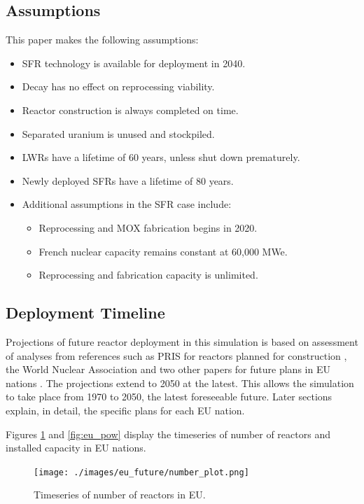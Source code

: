 \subsection{Assumptions}
This paper makes the following assumptions:
\begin{itemize}
        \item \gls{SFR} technology is available for deployment in 2040.
        \item Decay has no effect on reprocessing viability.
        \item Reactor construction is always completed on time.
        \item Separated uranium is unused and stockpiled.
        \item \glspl{LWR} have a lifetime of 60 years, unless shut down prematurely.
        \item Newly deployed \glspl{SFR} have a lifetime of 80 years.
        \item Additional assumptions in the \gls{SFR} case include:
        \begin{itemize}
        	\item Reprocessing and \gls{MOX} fabrication begins in 2020.
        	\item French nuclear capacity remains constant at 60,000 MWe.
        	\item Reprocessing and fabrication capacity is unlimited.
        \end{itemize}
\end{itemize}


\subsection{Deployment Timeline}
Projections of future reactor deployment in this simulation is based on assessment of analyses
from references such as \gls{PRIS} for reactors planned for construction \cite{iaea_pris_nodate},
the World Nuclear Association and two other papers for future plans in EU nations
\cite{world_nuclear_association_nuclear_2017, joskow_future_2012, hatch_politics_2015}.
The projections extend to 2050 at the latest. This allows the simulation to take place from
1970 to 2050, the latest foreseeable future. Later sections explain, in detail, the specific plans for each \gls{EU} nation.

Figures \ref{fig:eu_num} and \ref{fig:eu_pow} display the
timeseries of number of reactors and installed capacity in \gls{EU} nations.

\begin{figure}[htbp!]
	\begin{center}
		\texttt{[image: ./images/eu\_future/number\_plot.png]}
	\end{center}
	\caption{Timeseries of number of reactors in \gls{EU}.}
	\label{fig:eu_num}
\end{figure}


